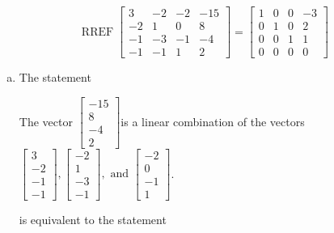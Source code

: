 \begin{exerciseAnswer} 
\[\operatorname{RREF}  \left[\begin{array}{ccc|c}
3 & -2 & -2 & -15 \\
-2 & 1 & 0 & 8 \\
-1 & -3 & -1 & -4 \\
-1 & -1 & 1 & 2
\end{array}\right] = \left[\begin{array}{ccc|c}
1 & 0 & 0 & -3 \\
0 & 1 & 0 & 2 \\
0 & 0 & 1 & 1 \\
0 & 0 & 0 & 0
\end{array}\right] \]
\begin{enumerate}[(a)]
\item  The statement 
\begin{center}\begin{minipage}{0.8\textwidth}
 The vector \( \left[\begin{array}{c}
-15 \\
8 \\
-4 \\
2
\end{array}\right] \)is a linear combination of the vectors \( \left[\begin{array}{c}
3 \\
-2 \\
-1 \\
-1
\end{array}\right] , \left[\begin{array}{c}
-2 \\
1 \\
-3 \\
-1
\end{array}\right] , \text{ and } \left[\begin{array}{c}
-2 \\
0 \\
-1 \\
1
\end{array}\right] \). 
\end{minipage}\end{center}
     is equivalent to the statement 
\begin{center}\begin{minipage}{0.8\textwidth}
 The vector equation \( x_{1} \left[\begin{array}{c}
3 \\
-2 \\
-1 \\

\end{array}
\end{minipage}
\end{center}
\end{enumerate}
\end{exerciseAnswer}
